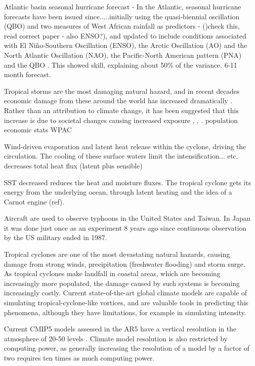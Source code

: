Atlantic basin seasonal hurricane forecast - In the Atlantic, seasonal hurricane forecasts have been issued since.....initially using the quasi-biennial oscillation (QBO) and two measures of West African rainfall as predictors \citep{gray1984atlantic} - ()check this, read correct paper - also ENSO?), and updated to include conditions associated with El Ni\~{n}o-Southern Oscillation (ENSO), the Arctic Oscillation (AO) and the North Atlantic Oscillation (NAO), the Pacific-North American pattern (PNA) and the QBO \citep{klotzbach2004updated}. This showed skill, explaining about 50\% of the variance. 6-11 month forecast.

Tropical storms are the most damaging natural hazard, and in recent decades economic damage from these around the world has increased dramatically \citep{weinkle2012historical}. Rather than an attribution to climate change, it has been suggested that this increase is due to societal changes causing increased exposure \citep{pielke1998normalized}, \citep{pielke2008normalized}, \citep{weinkle2012historical}. population economic stats WPAC

Wind-driven evaporation and latent heat release within the cyclone, driving the circulation.
The cooling of these surface waters limit the intensification... etc. decreases total heat flux (latent plus sensible)

SST decreased reduces the heat and moisture fluxes.
The tropical cyclone gets its energy from the underlying ocean, through latent heating and the idea of a Carnot engine (ref). 

Aircraft are used to observe typhoons in the United States and Taiwan. In Japan it was done just once as an experiment 8 years ago since continuous observation by the US military ended in 1987.

Tropical cyclones are one of the most devastating natural hazards, causing damage from strong winds, precipitation (freshwater flooding) and storm surge. As tropical cyclones make landfall in coastal areas, which are becoming increasingly more populated, the damage caused by such systems is becoming increasingly costly.  Current state-of-the-art global climate models are capable of simulating tropical-cyclone-like vortices, and are valuable tools in predicting this phenomena, although they have limitations, for example in simulating intensity.

Current CMIP5 models assessed in the AR5 have a vertical resolution in the atmosphere of 20-50 levels \citep{climodaus}. 
Climate model resolution is also restricted by computing power, as generally increasing the resolution of a model by a factor of two requires ten times as much computing power.

